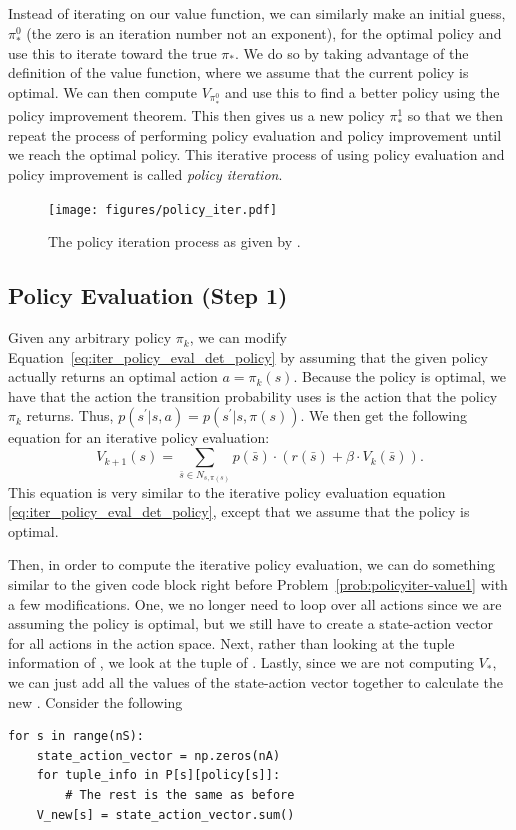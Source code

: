 Instead of iterating on our value function, we can similarly make an initial guess, $\pi_*^0$ (the zero is an iteration number not an exponent), for the optimal policy and use this to iterate toward the true $\pi_*$.
We do so by taking advantage of the definition of the value function, where we assume that the current policy is optimal.
We can then compute $V_{\pi_*^0}$ and use this to find a better policy using the policy improvement theorem.
This then gives us a new policy $\pi_*^1$ so that we then repeat the process of performing policy evaluation and policy improvement until we reach the optimal policy.
This iterative process of using policy evaluation and policy improvement is called \emph{policy iteration}.
\begin{figure}[H]
\centering
\texttt{[image: figures/policy\_iter.pdf]}
\caption{The policy iteration process as given by \cite{artRL2023hu}.}
\end{figure}

\subsection*{Policy Evaluation (Step 1)}
Given any arbitrary policy $\pi_k$, we can modify Equation\ \ref{eq:iter_policy_eval_det_policy} by assuming that the given policy actually returns an optimal action $a=\pi_k(s)$.
Because the policy is optimal, we have that the action the transition probability uses is the action that the policy $\pi_k$ returns.
Thus, $p(s^\prime|s,a)=p(s^\prime|s,\pi(s))$.
We then get the following equation for an iterative policy evaluation:
\begin{equation}
    V_{k+1}(s) = \sum_{\bar{s}\in N_{s,\pi(s)}} p(\bar{s})\cdot(r(\bar{s}) + \beta \cdot V_{k}(\bar{s})).
    \label{eq:iter_policy_eval_optimal_policy_deterministic_assumption_lab}
\end{equation}
This equation is very similar to the iterative policy evaluation equation \ref{eq:iter_policy_eval_det_policy}, except that we assume that the policy is optimal.


Then, in order to compute the iterative policy evaluation, we can do something similar to the given code block right before Problem\ \ref{prob:policyiter-value1} with a few modifications.
One, we no longer need to loop over all actions since we are assuming the policy is optimal, but we still have to create a state-action vector for all actions in the action space.
Next, rather than looking at the tuple information of , we look at the tuple of .
Lastly, since we are not computing $V_*$, we can just add all the values of the state-action vector together to calculate the new .
Consider the following
\begin{lstlisting}
for s in range(nS):
    state_action_vector = np.zeros(nA)
    for tuple_info in P[s][policy[s]]:
        # The rest is the same as before
    V_new[s] = state_action_vector.sum()
\end{lstlisting}

